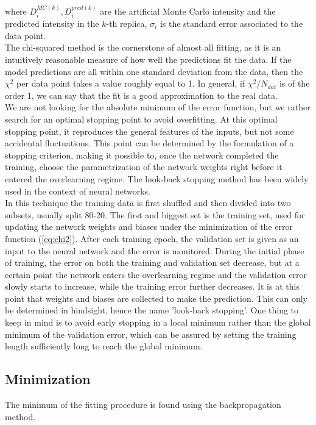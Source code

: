 where $D_i^{MC(k)}, D_i^{pred(k)}$ are the artificial Monte Carlo intensity and the predicted intensity in the $k$-th replica, $\sigma_i$ is the standard error associated to the data point. \\
The chi-squared method is the cornerstone of almost all fitting, as it is an intuitively reasonable measure of how well the predictions fit the data. If the model predictions are all within one standard deviation from the data, then the $\chi^2$ per data point takes a value roughly equal to 1. In general, if $\chi^2/N_{dat}$ is of the order 1, we can say that the fit is a good approximation to the real data. \\

We are not looking for the absolute minimum of the error function, but we rather search for an optimal stopping point to avoid overfitting. At this optimal stopping point, it reproduces the general features of the inputs, but not some accidental fluctuations. This point can be determined by the formulation of a stopping criterion, making it possible to, once the network completed the training, choose the parametrization of the network weights right before it entered the overlearning regime. The look-back stopping method has been widely used in the context of neural networks. \\
In this technique the training data is first shuffled and then divided into two subsets, usually split 80-20. The first and biggest set is the training set, used for updating the network weights and biases under the minimization of the error function (\ref{eq:chi2}). After each training epoch, the validation set is given as an input to the neural network and the error is monitored. During the initial phase of training, the error on both the training and validation set decrease, but at a certain point the network enters the overlearning regime and the validation error slowly starts to increase, while the training error further decreases. It is at this point that weights and biases are collected to make the prediction. This can only be determined in hindsight, hence the name 'look-back stopping'. One thing to keep in mind is to avoid early stopping in a local minimum rather than the global minimum of the validation error, which can be assured by setting the training length sufficiently long to reach the global minimum.

\subsection{Minimization}
The minimum of the fitting procedure is found using the backpropagation method. 

